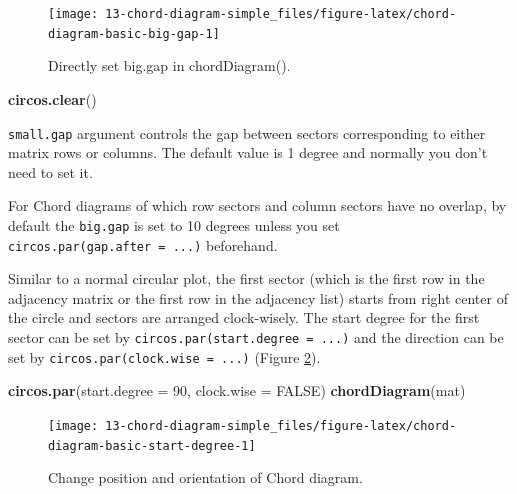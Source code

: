 \documentclass[]{book}
\newenvironment{Shaded}{\begin{snugshade}}{\end{snugshade}}
\newcommand{\KeywordTok}[1]{\textcolor[rgb]{0.13,0.29,0.53}{\textbf{#1}}}
\newcommand{\DataTypeTok}[1]{\textcolor[rgb]{0.13,0.29,0.53}{#1}}
\newcommand{\DecValTok}[1]{\textcolor[rgb]{0.00,0.00,0.81}{#1}}
\newcommand{\OtherTok}[1]{\textcolor[rgb]{0.56,0.35,0.01}{#1}}
\newcommand{\NormalTok}[1]{#1}
\begin{document}
\begin{figure}

{\centering \texttt{[image: 13-chord-diagram-simple\_files/figure-latex/chord-diagram-basic-big-gap-1]} 

}

\caption{Directly set big.gap in chordDiagram().}\label{fig:chord-diagram-basic-big-gap}
\end{figure}

\begin{Shaded}
\begin{Highlighting}[]
\KeywordTok{circos.clear}\NormalTok{()}
\end{Highlighting}
\end{Shaded}

\texttt{small.gap} argument controls the gap between sectors
corresponding to either matrix rows or columns. The default value is 1
degree and normally you don't need to set it.

For Chord diagrams of which row sectors and column sectors have no
overlap, by default the \texttt{big.gap} is set to 10 degrees unless you
set \texttt{circos.par(gap.after\ =\ ...)} beforehand.

Similar to a normal circular plot, the first sector (which is the first
row in the adjacency matrix or the first row in the adjacency list)
starts from right center of the circle and sectors are arranged
clock-wisely. The start degree for the first sector can be set by
\texttt{circos.par(start.degree\ =\ ...)} and the direction can be set
by \texttt{circos.par(clock.wise\ =\ ...)} (Figure
\ref{fig:chord-diagram-basic-start-degree}).

\begin{Shaded}
\begin{Highlighting}[]
\KeywordTok{circos.par}\NormalTok{(}\DataTypeTok{start.degree =} \DecValTok{90}\NormalTok{, }\DataTypeTok{clock.wise =} \OtherTok{FALSE}\NormalTok{)}
\KeywordTok{chordDiagram}\NormalTok{(mat)}
\end{Highlighting}
\end{Shaded}

\begin{figure}

{\centering \texttt{[image: 13-chord-diagram-simple\_files/figure-latex/chord-diagram-basic-start-degree-1]} 

}

\caption{Change position and orientation of Chord diagram.}\label{fig:chord-diagram-basic-start-degree}
\end{figure}
\end{document}
